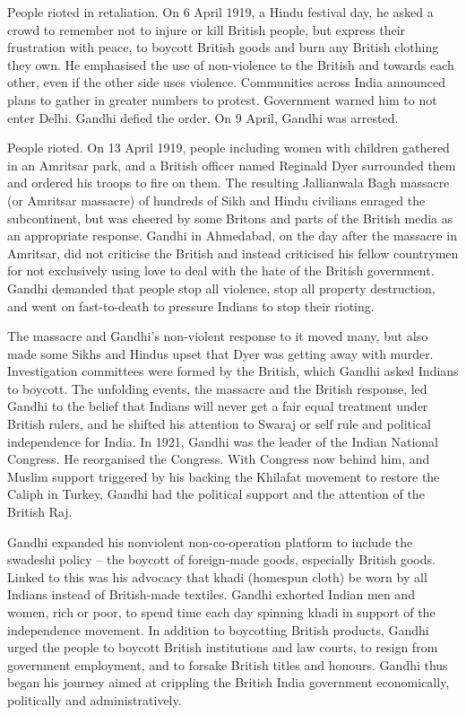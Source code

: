 People rioted in retaliation. On 6 April 1919, a Hindu festival day, he
asked a crowd to remember not to injure or kill British people, but
express their frustration with peace, to boycott British goods and burn
any British clothing they own. He emphasised the use of non-violence to
the British and towards each other, even if the other side uses
violence. Communities across India announced plans to gather in greater
numbers to protest. Government warned him to not enter Delhi. Gandhi
defied the order. On 9 April, Gandhi was arrested.

People rioted. On 13 April 1919, people including women with children
gathered in an Amritsar park, and a British officer named Reginald Dyer
surrounded them and ordered his troops to fire on them. The resulting
Jallianwala Bagh massacre (or Amritsar massacre) of hundreds of Sikh and
Hindu civilians enraged the subcontinent, but was cheered by some
Britons and parts of the British media as an appropriate response.
Gandhi in Ahmedabad, on the day after the massacre in Amritsar, did not
criticise the British and instead criticised his fellow countrymen for
not exclusively using love to deal with the hate of the British
government. Gandhi demanded that people stop all violence, stop all
property destruction, and went on fast-to-death to pressure Indians to
stop their rioting.

The massacre and Gandhi's non-violent response to it moved many, but
also made some Sikhs and Hindus upset that Dyer was getting away with
murder. Investigation committees were formed by the British, which
Gandhi asked Indians to boycott. The unfolding events, the massacre and
the British response, led Gandhi to the belief that Indians will never
get a fair equal treatment under British rulers, and he shifted his
attention to Swaraj or self rule and political independence for India.
In 1921, Gandhi was the leader of the Indian National Congress. He
reorganised the Congress. With Congress now behind him, and Muslim
support triggered by his backing the Khilafat movement to restore the
Caliph in Turkey, Gandhi had the political support and the attention of
the British Raj.

Gandhi expanded his nonviolent non-co-operation platform to include the
swadeshi policy -- the boycott of foreign-made goods, especially British
goods. Linked to this was his advocacy that khadi (homespun cloth) be
worn by all Indians instead of British-made textiles. Gandhi exhorted
Indian men and women, rich or poor, to spend time each day spinning
khadi in support of the independence movement. In addition to boycotting
British products, Gandhi urged the people to boycott British
institutions and law courts, to resign from government employment, and
to forsake British titles and honours. Gandhi thus began his journey
aimed at crippling the British India government economically,
politically and administratively.

